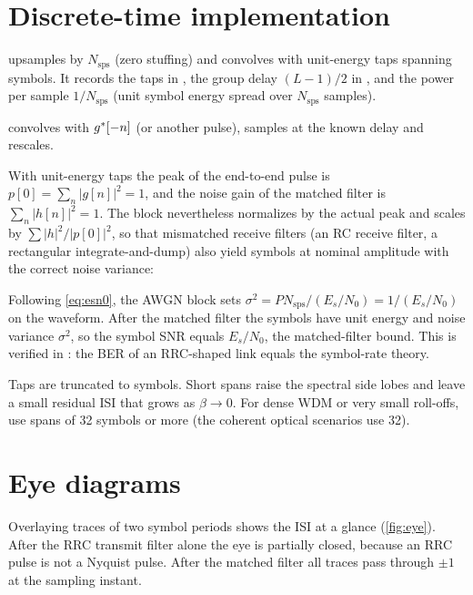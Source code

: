 \section{Discrete-time implementation}
\begin{incode}
 upsamples by $N_{\mathrm{sps}}$ (zero stuffing) and convolves with
unit-energy taps spanning  symbols. It records the taps in , the
group delay $(L-1)/2$ in , and the power per sample $1/N_{\mathrm{sps}}$ (unit
symbol energy spread over $N_{\mathrm{sps}}$ samples).

 convolves with $g^{*}[-n]$ (or another pulse), samples at the known
delay and rescales.
\end{incode}


With unit-energy taps the peak of the end-to-end pulse is
$p[0]=\sum_n|g[n]|^2=1$, and the noise gain of the matched filter is $\sum_n|h[n]|^2=1$. The
block nevertheless normalizes by the actual peak and scales  by
$\sum|h|^2/|p[0]|^2$, so that mismatched receive filters (an RC receive filter, a rectangular
integrate-and-dump) also yield symbols at nominal amplitude with the correct noise variance:

Following \cref{eq:esn0}, the AWGN block sets $\sigma^2=P N_{\mathrm{sps}}/(E_s/N_0)=1/(E_s/N_0)$
on the waveform. After the matched filter the symbols have unit energy and noise variance
$\sigma^2$, so the symbol SNR equals $E_s/N_0$, the matched-filter bound. This is verified in
: the BER of an
RRC-shaped link equals the symbol-rate theory.

\begin{pitfall}[Truncation]
Taps are truncated to  symbols. Short spans raise the spectral side lobes and leave
a small residual ISI that grows as $\beta\to0$. For dense WDM or very small roll-offs, use
spans of 32 symbols or more (the coherent optical scenarios use 32).
\end{pitfall}

\section{Eye diagrams}
Overlaying traces of two symbol periods shows the ISI at a glance (\cref{fig:eye}). After the
RRC transmit filter alone the eye is partially closed, because an RRC pulse is not a Nyquist
pulse. After the matched filter all traces pass through $\pm1$ at the sampling instant.

